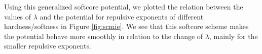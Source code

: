 Using this generalized softcore potential, we plotted the relation between the values of $\lambda$ and the potential for repulsive exponents of different hardness/softness in Figure \ref{fig:scmie}. We see that this softcore scheme makes the potential behave more smoothly in relation to the change of $\lambda$, mainly for the smaller repulsive exponents. 
 

\begin{figure}%
	\centering
	\hspace{0.05cm}%
	 \\


\end{figure}
